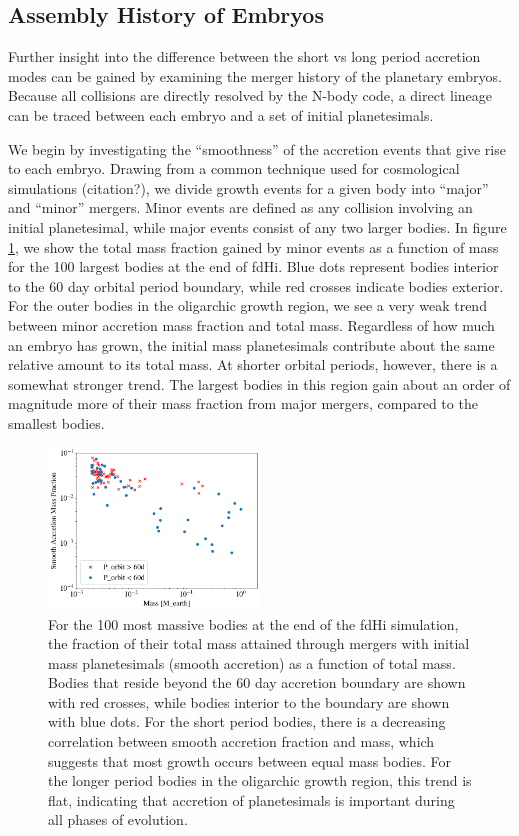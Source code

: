 \documentclass[twocolumn]{aastex63}
\begin{document}
\subsection{Assembly History of Embryos}\label{sec:assembly}

Further insight into the difference between the short vs long period accretion modes can be gained by examining the merger history of the planetary embryos. Because all collisions are directly resolved by the N-body code, a direct lineage can be traced between each embryo and a set of initial planetesimals.

We begin by investigating the ``smoothness'' of the accretion events
that give rise to each embryo. Drawing from a common technique used
for cosmological simulations (citation?), we divide growth events for
a given body into ``major'' and ``minor'' mergers. Minor events are defined as any collision involving an initial planetesimal, while major events consist of any two larger bodies. In figure \ref{fig:minor_frac}, we show the total mass fraction gained by minor events as a function of mass for the 100 largest bodies at the end of fdHi. Blue dots represent bodies interior to the 60 day orbital period boundary, while red crosses indicate bodies exterior. For the outer bodies in the oligarchic growth region, we see a very weak trend between minor accretion mass fraction and total mass. Regardless of how much an embryo has grown, the initial mass planetesimals contribute about the same relative amount to its total mass. At shorter orbital periods, however, there is a somewhat stronger trend. The largest bodies in this region gain about an order of magnitude more of their mass fraction from major mergers, compared to the smallest bodies.

\begin{figure}
\begin{center}
    \includegraphics[width=0.5\textwidth]{figures/minor_frac.png}
    \caption{For the 100 most massive bodies at the end of the fdHi simulation, the fraction of their total mass attained through mergers with initial mass planetesimals (smooth accretion) as a function of total mass. Bodies that reside beyond the 60 day accretion boundary are shown with red crosses, while bodies interior to the boundary are shown with blue dots. For the short period bodies, there is a decreasing correlation between smooth accretion fraction and mass, which suggests that most growth occurs between equal mass bodies. For the longer period bodies in the oligarchic growth region, this trend is flat, indicating that accretion of planetesimals is important during all phases of evolution.\label{fig:minor_frac}}
\end{center}
\end{figure}
\end{document}
